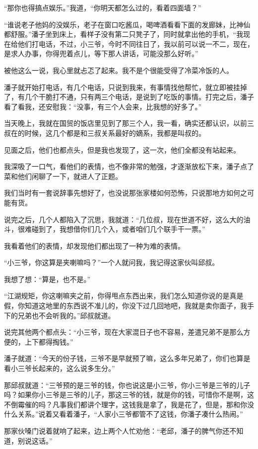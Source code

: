 “那你也得搞点娱乐。”我道，“你明天都怎么过的，看着四面墙？”

“谁说老子他妈的没娱乐，老子在窗口吃酱瓜，喝啤酒看看下面的发廊妹，比神仙都舒服。”潘子坐到床上，看样子没有第二只凳子了，同时就拿出他的手机，“我现在给他们打电话，不过，小三爷，今时不同往日了，我以前可以说一不二，现在，是求人办事，你得兜着点儿，等下那人讲话，可能没那么好听。”

被他这么一说，我心里就忐忑了起来。我不是个很能受得了冷菜冷饭的人。

潘子就开始打电话，有几个电话，只说到我来，有事情找他帮忙，就立即被挂掉了，有几个干脆打不通，只有两三个电话，是说到了吃饭的事情。打完之后，潘子看了看我，还安慰我：“没事，有三个人会来，比我想的好多了。”

当天晚上，我就在国贸的饭店里见到了那三个人，我一看，确实还都认识，以前三叔在的时候，这几个都是和三叔关系最好的嫡系，我都是叫叔的。

见面之后，他们也都点头，但是我也发现了，这一次，他们全都没有站起来。

我深吸了一口气，看他们的表情，也不像非常的勉强，才逐渐放松下来，潘子点了菜和他们闲聊了一下，就进人了正题。

我们当时有一套说辞事先想好了，也没说那张家楼如何恐怖，只说那地方如何之可能有货。

说完之后，几个人都陷入了沉思，我就道：“几位叔，现在世道不好，这么大的油斗，很难碰到了，我想借你们几个入，或者咱们几个联手干一票。”

我看着他们的表情，却发现他们都出现了一种为难的表情。

“小三爷，你这算是夹喇嘛吗？”一个人就问我，我记得这家伙叫邱叔。

我想了想：“算是，也不是。”

“江湖规矩，你这喇嘛夹之前，你得甩点东西出来，我们怎么知道你说的是真是假，你知道这地里的东西说不准儿的，你没下过几回地吧，我就是卖你面子，我手下的兄弟也不会听我的。”邱叔就道。

说完其他两个都点头：“小三爷，现在大家混日子也不容易，差遣兄弟不是那么方便的，上下都得掏钱。”

潘子就道：“今天的份子钱，三爷不是早就预了嘛，这么多年兄弟了，你们也算是看小三爷长起来的，这么说多生分。”

那邱叔就道：“三爷预的是三爷的钱，你也说这是小三爷，你小三爷是三爷的儿子吗？如果你小三爷是三爷的儿子，那这三爷的钱，就是你的钱，可惜你不是啊，这不倒霉催的吗？凡事我们都讲个理字，这钱我是拿了，我是花了，但是，那和你没什么关系。”说着又看着潘子，“人家小三爷都管不了这钱，你潘子凑什么热闹。”

那家伙嗓门说着就响了起来，边上两个人忙劝他：“老邱，潘子的脾气你还不知道，别说这话。”

